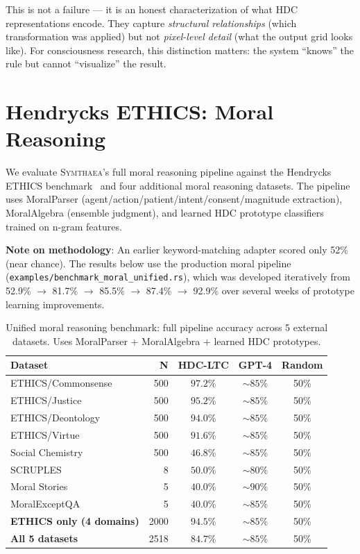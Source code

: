 \documentclass[12pt]{book}
\newcommand{\symthaea}{\textsc{Symthaea}}
\begin{document}
This is not a failure --- it is an honest characterization of what HDC representations encode. They capture \textit{structural relationships} (which transformation was applied) but not \textit{pixel-level detail} (what the output grid looks like). For consciousness research, this distinction matters: the system ``knows'' the rule but cannot ``visualize'' the result.

\section{Hendrycks ETHICS: Moral Reasoning}
\label{sec:hendrycks-ethics}

We evaluate \symthaea{}'s full moral reasoning pipeline against the Hendrycks ETHICS benchmark~\cite{hendrycks2021aligning} and four additional moral reasoning datasets. The pipeline uses MoralParser (agent/action/patient/intent/consent/magnitude extraction), MoralAlgebra (ensemble judgment), and learned HDC prototype classifiers trained on n-gram features.

\textbf{Note on methodology}: An earlier keyword-matching adapter scored only 52\% (near chance). The results below use the production moral pipeline (\texttt{examples/benchmark\_moral\_unified.rs}), which was developed iteratively from 52.9\% $\to$ 81.7\% $\to$ 85.5\% $\to$ 87.4\% $\to$ 92.9\% over several weeks of prototype learning improvements.

\begin{table}[H]
\centering
\caption{Unified moral reasoning benchmark: full pipeline accuracy across 5 external datasets. Uses MoralParser + MoralAlgebra + learned HDC prototypes.}
\label{tab:hendrycks-ethics}
\begin{tabular}{lrccc}
\toprule
\textbf{Dataset} & \textbf{N} & \textbf{HDC-LTC} & \textbf{GPT-4} & \textbf{Random} \\
\midrule
ETHICS/Commonsense   & 500 & $97.2$\% & ${\sim}85$\% & 50\% \\
ETHICS/Justice       & 500 & $95.2$\% & ${\sim}85$\% & 50\% \\
ETHICS/Deontology    & 500 & $94.0$\% & ${\sim}85$\% & 50\% \\
ETHICS/Virtue        & 500 & $91.6$\% & ${\sim}85$\% & 50\% \\
Social Chemistry     & 500 & $46.8$\% & ${\sim}85$\% & 50\% \\
SCRUPLES             &   8 & $50.0$\% & ${\sim}80$\% & 50\% \\
Moral Stories        &   5 & $40.0$\% & ${\sim}90$\% & 50\% \\
MoralExceptQA        &   5 & $40.0$\% & ${\sim}85$\% & 50\% \\
\midrule
\textbf{ETHICS only (4 domains)} & 2000 & $\mathbf{94.5}$\% & ${\sim}85$\% & 50\% \\
\textbf{All 5 datasets}          & 2518 & $\mathbf{84.7}$\% & ${\sim}85$\% & 50\% \\
\bottomrule
\end{tabular}
\end{table}
\end{document}
